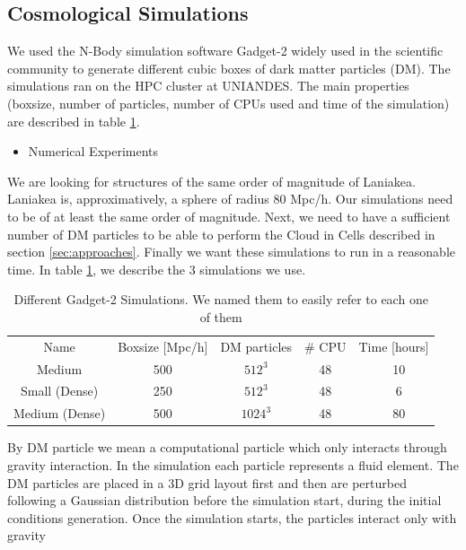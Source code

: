 \documentclass[12pt]{article}
\begin{document}
\subsection{Cosmological Simulations}\label{sec:sims}
\begin{par}
We used the N-Body simulation software Gadget-2
 \cite{springel_gadget_2_2005}
widely used in the scientific community to
 generate different cubic boxes of dark matter
  particles
  (DM). The simulations ran on the HPC cluster at
   UNIANDES.
  The main properties (boxsize, number of
   particles, number of CPUs used and time of the
    simulation) are described in table
     \ref{tab:sims}. \\
\end{par}
\begin{itemize}
\item Numerical Experiments
\end{itemize}
\begin{par}
We are looking for structures of the same order of
 magnitude of Laniakea. Laniakea is, approximatively, a
  sphere of radius 80 Mpc/h. Our simulations need to be
   of at least the same order of magnitude. Next, we
    need to have a sufficient number of DM particles to
     be able to perform the Cloud in Cells described in
      section \ref{sec:approaches}. Finally we want
       these simulations to run in a reasonable time. 
       In table \ref{tab:sims}, we describe the 3
        simulations we use. 
\end{par}
\begin{table}[ht]
    \centering
    \begin{tabular}{|c|c|c|c|c|}
        Name & Boxsize [Mpc/h] & DM particles & \# CPU & Time [hours] \\
        Medium & 500 & $512^{3}$ & 48 & ~ 10 \\
        Small (Dense) & 250 & $512^{3}$ & 48 & ~ 6  \\
        Medium (Dense) & 500 & $1024^{3}$ & 48 & ~ 80\\
    \end{tabular}
    \caption{Different Gadget-2 Simulations. We named them to easily refer to each one of them}
    \label{tab:sims}
\end{table}
\FloatBarrier

By DM particle we mean a computational particle which only
 interacts through gravity
interaction. In the simulation each particle
 represents a fluid element. The DM particles are
placed in a 3D grid layout first and then are
 perturbed following a Gaussian distribution
before the simulation start, during the initial
 conditions generation. Once the simulation starts, the particles interact only with gravity\\
\end{document}
